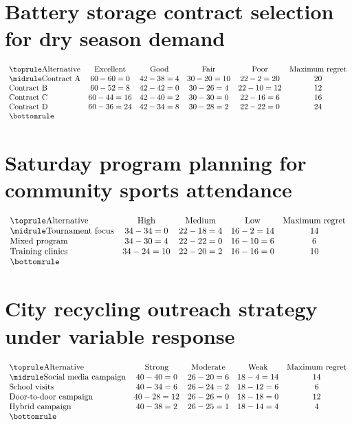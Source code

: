 \section*{Battery storage contract selection for dry season demand}
\[\begin{array}{lccccc}
			\toprule
			\text{Alternative} & \text{Excellent} & \text{Good} & \text{Fair} & \text{Poor} & \text{Maximum regret}\\
			\midrule
			\text{Contract A} & 60-60=0 & 42-38=4 & 30-20=10 & 22-2=20 & 20\\
			\text{Contract B} & 60-52=8 & 42-42=0 & 30-26=4 & 22-10=12 & 12\\
			\text{Contract C} & 60-44=16 & 42-40=2 & 30-30=0 & 22-16=6 & 16\\
			\text{Contract D} & 60-36=24 & 42-34=8 & 30-28=2 & 22-22=0 & 24\\
			\bottomrule
		\end{array}\]

\section*{Saturday program planning for community sports attendance}
\[\begin{array}{lcccc}
			\toprule
			\text{Alternative} & \text{High} & \text{Medium} & \text{Low} & \text{Maximum regret}\\
			\midrule
			\text{Tournament focus} & 34-34=0 & 22-18=4 & 16-2=14 & 14\\
			\text{Mixed program} & 34-30=4 & 22-22=0 & 16-10=6 & 6\\
			\text{Training clinics} & 34-24=10 & 22-20=2 & 16-16=0 & 10\\
			\bottomrule
		\end{array}\]

\section*{City recycling outreach strategy under variable response}
\[\begin{array}{lcccc}
			\toprule
			\text{Alternative} & \text{Strong} & \text{Moderate} & \text{Weak} & \text{Maximum regret}\\
			\midrule
			\text{Social media campaign} & 40-40=0 & 26-20=6 & 18-4=14 & 14\\
			\text{School visits} & 40-34=6 & 26-24=2 & 18-12=6 & 6\\
			\text{Door-to-door campaign} & 40-28=12 & 26-26=0 & 18-18=0 & 12\\
			\text{Hybrid campaign} & 40-38=2 & 26-25=1 & 18-14=4 & 4\\
			\bottomrule
		\end{array}\]

